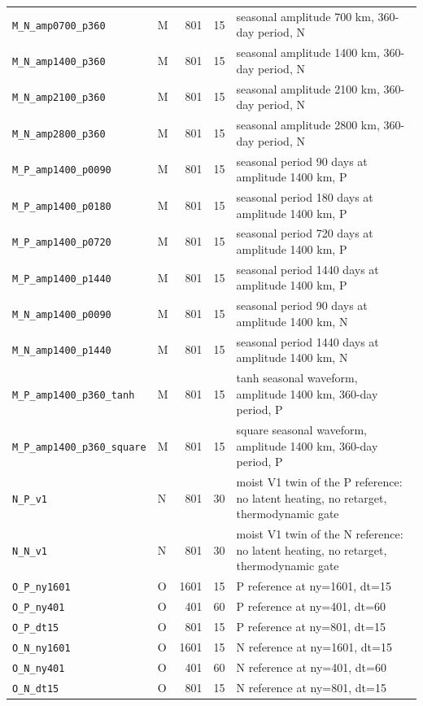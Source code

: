 {\begin{longtable}{llrrp{7.0cm}}
\texttt{M\_N\_amp0700\_p360} & M & 801 & 15 & seasonal amplitude 700 km, 360-day period, N\\
\texttt{M\_N\_amp1400\_p360} & M & 801 & 15 & seasonal amplitude 1400 km, 360-day period, N\\
\texttt{M\_N\_amp2100\_p360} & M & 801 & 15 & seasonal amplitude 2100 km, 360-day period, N\\
\texttt{M\_N\_amp2800\_p360} & M & 801 & 15 & seasonal amplitude 2800 km, 360-day period, N\\
\texttt{M\_P\_amp1400\_p0090} & M & 801 & 15 & seasonal period 90 days at amplitude 1400 km, P\\
\texttt{M\_P\_amp1400\_p0180} & M & 801 & 15 & seasonal period 180 days at amplitude 1400 km, P\\
\texttt{M\_P\_amp1400\_p0720} & M & 801 & 15 & seasonal period 720 days at amplitude 1400 km, P\\
\texttt{M\_P\_amp1400\_p1440} & M & 801 & 15 & seasonal period 1440 days at amplitude 1400 km, P\\
\texttt{M\_N\_amp1400\_p0090} & M & 801 & 15 & seasonal period 90 days at amplitude 1400 km, N\\
\texttt{M\_N\_amp1400\_p1440} & M & 801 & 15 & seasonal period 1440 days at amplitude 1400 km, N\\
\texttt{M\_P\_amp1400\_p360\_tanh} & M & 801 & 15 & tanh seasonal waveform, amplitude 1400 km, 360-day period, P\\
\texttt{M\_P\_amp1400\_p360\_square} & M & 801 & 15 & square seasonal waveform, amplitude 1400 km, 360-day period, P\\
\texttt{N\_P\_v1} & N & 801 & 30 & moist V1 twin of the P reference: no latent heating, no retarget, thermodynamic gate\\
\texttt{N\_N\_v1} & N & 801 & 30 & moist V1 twin of the N reference: no latent heating, no retarget, thermodynamic gate\\
\texttt{O\_P\_ny1601} & O & 1601 & 15 & P reference at ny=1601, dt=15\\
\texttt{O\_P\_ny401} & O & 401 & 60 & P reference at ny=401, dt=60\\
\texttt{O\_P\_dt15} & O & 801 & 15 & P reference at ny=801, dt=15\\
\texttt{O\_N\_ny1601} & O & 1601 & 15 & N reference at ny=1601, dt=15\\
\texttt{O\_N\_ny401} & O & 401 & 60 & N reference at ny=401, dt=60\\
\texttt{O\_N\_dt15} & O & 801 & 15 & N reference at ny=801, dt=15\\

\end{longtable}}
